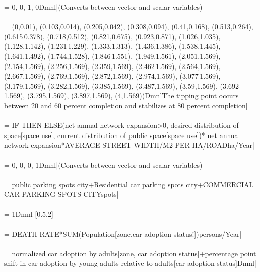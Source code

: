  = {\small 0, 0, 1, 0Dmnl|}{\small  (Converts between vector and scalar variables)} \\ \\ 
 = {\small (0,0.01), (0.103,0.014), (0.205,0.042), (0.308,0.094), (0.41,0.168), (0.513,0.264), (0.615\,0.378), (0.718,0.512), (0.821,0.675), (0.923,0.871), (1.026,1.035), (1.128,1.142), (1.231\,1.229), (1.333,1.313), (1.436,1.386), (1.538,1.445), (1.641,1.492), (1.744,1.528), (1.846\,1.551), (1.949,1.561), (2.051,1.569), (2.154,1.569), (2.256,1.569), (2.359,1.569), (2.462\,1.569), (2.564,1.569), (2.667,1.569), (2.769,1.569), (2.872,1.569), (2.974,1.569), (3.077\,1.569), (3.179,1.569), (3.282,1.569), (3.385,1.569), (3.487,1.569), (3.59,1.569), (3.692\,1.569), (3.795,1.569), (3.897,1.569), (4,1.569))DmnlThe tipping point occurs between 20 and 60 percent completion and stabilizes at 80 percent completion|} \\ \\ 
 = {\small IF THEN ELSE(net annual network expansion>0, desired distribution of space[space use], current distribution of public space[space use])* net annual network expansion*AVERAGE STREET WIDTH/M2 PER HA/ROADha/Year|} \\ \\ 
 = {\small 0, 0, 0, 1Dmnl|}{\small  (Converts between vector and scalar variables)} \\ \\ 
 = {\small public parking spots city+Residential car parking spots city+COMMERCIAL CAR PARKING SPOTS CITYspots|} \\ \\ 
 = {\small 1Dmnl [0.5,2]|} \\ \\ 
 = {\small DEATH RATE*SUM(Population[zone,car adoption status!])persons/Year|} \\ \\ 
 = {\small normalized car adoption by adults[zone, car adoption status]+percentage point shift in car adoption by young adults relative to adults[car adoption status]Dmnl|} \\ \\ 
